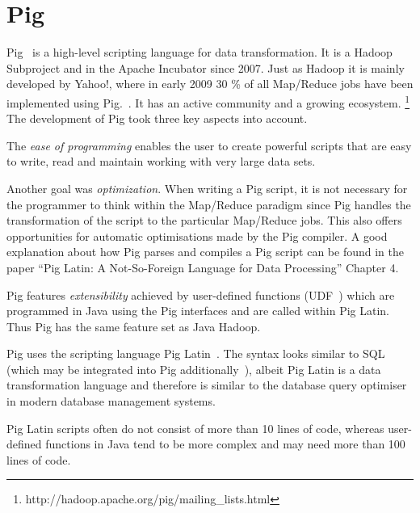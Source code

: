 \section{Pig}

Pig~\cite{pigWebsite} is a high-level scripting language for data transformation. It is a Hadoop Subproject and in the Apache Incubator since 2007. Just as Hadoop it is mainly developed by Yahoo!, where in early 2009 30 \% of all Map/Reduce jobs have been implemented using Pig.~\cite{pig30percent}. It has an active community and a growing ecosystem. \footnote{http://hadoop.apache.org/pig/mailing\_lists.html}\\
The development of Pig took three key aspects into account. ~\cite{pigWebsite}

The \emph{ease of programming} enables the user to create powerful scripts that are easy to write, read and maintain working with very large data sets.

Another goal was \emph{optimization}. When writing a Pig script, it is not necessary for the programmer to think within the Map/Reduce paradigm since Pig handles the transformation of the script to the particular Map/Reduce jobs. This also offers opportunities for automatic optimisations made by the Pig compiler. A good explanation about how Pig parses and compiles a Pig script can be found in the paper ``Pig Latin: A Not-So-Foreign Language for Data Processing'' Chapter 4.~\cite{pigNotForeign}

Pig features \emph{extensibility} achieved by user-defined functions (UDF~\cite{pigUdf}) which are programmed in Java using the Pig interfaces and are called within Pig Latin. Thus Pig has the same feature set as Java Hadoop.

Pig uses the scripting language Pig Latin~\cite{pigManual}. The syntax looks similar to SQL (which may be integrated into Pig additionally~\cite{pigSql}), albeit Pig Latin is a data transformation language and therefore is similar to the database query optimiser in modern database management systems.

Pig Latin scripts often do not consist of more than 10 lines of code, whereas user-defined functions in Java tend to be more complex and may need more than 100 lines of code.
                                                                                                               